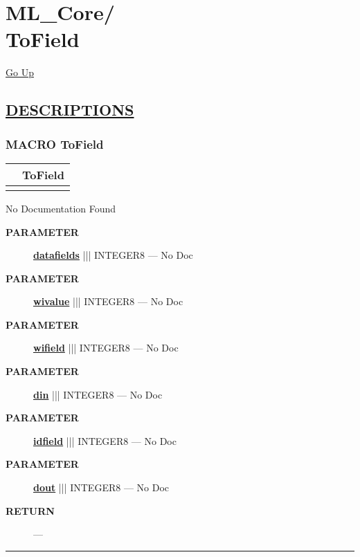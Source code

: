 \chapter*{\color{headfile}
{\large ML\_Core\slash\hspace{0pt}}
 \\
ToField
}
\hypertarget{ecldoc:toc:ML_Core.ToField}{}
\hyperlink{ecldoc:toc:root/ML_Core}{Go Up}


\section*{\underline{\textsf{DESCRIPTIONS}}}
\subsection*{\textsf{\colorbox{headtoc}{\color{white} MACRO}
ToField}}

\hypertarget{ecldoc:ml_core.tofield}{}

{\renewcommand{\arraystretch}{1.5}
\begin{tabularx}{\textwidth}{|>{\raggedright\arraybackslash}l|X|}
\hline
\hspace{0pt}\mytexttt{\color{red} } & \textbf{ToField} \\
\hline
\multicolumn{2}{|>{\raggedright\arraybackslash}X|}{\hspace{0pt}\mytexttt{\color{param} (dIn,dOut,idfield='', wifield='', wivalue='',datafields='')}} \\
\hline
\end{tabularx}
}

\par





No Documentation Found






\par
\begin{description}
\item [\colorbox{tagtype}{\color{white} \textbf{\textsf{PARAMETER}}}] \textbf{\underline{datafields}} ||| INTEGER8 --- No Doc
\item [\colorbox{tagtype}{\color{white} \textbf{\textsf{PARAMETER}}}] \textbf{\underline{wivalue}} ||| INTEGER8 --- No Doc
\item [\colorbox{tagtype}{\color{white} \textbf{\textsf{PARAMETER}}}] \textbf{\underline{wifield}} ||| INTEGER8 --- No Doc
\item [\colorbox{tagtype}{\color{white} \textbf{\textsf{PARAMETER}}}] \textbf{\underline{din}} ||| INTEGER8 --- No Doc
\item [\colorbox{tagtype}{\color{white} \textbf{\textsf{PARAMETER}}}] \textbf{\underline{idfield}} ||| INTEGER8 --- No Doc
\item [\colorbox{tagtype}{\color{white} \textbf{\textsf{PARAMETER}}}] \textbf{\underline{dout}} ||| INTEGER8 --- No Doc
\end{description}







\par
\begin{description}
\item [\colorbox{tagtype}{\color{white} \textbf{\textsf{RETURN}}}] \textbf{} --- 
\end{description}




\rule{\linewidth}{0.5pt}
